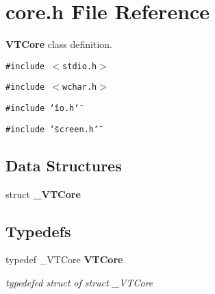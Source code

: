 \section{core.h File Reference}
\label{core_8h}
{\bf VTCore} class definition. 


{\tt \#include $<$stdio.h$>$}\par
{\tt \#include $<$wchar.h$>$}\par
{\tt \#include \char`\"{}io.h\char`\"{}}\par
{\tt \#include \char`\"{}screen.h\char`\"{}}\par
\subsection*{Data Structures}
\begin{CompactItemize}
\item 
struct {\bf \_\-VTCore}
\end{CompactItemize}
\subsection*{Typedefs}
\begin{CompactItemize}
\item 
{}
typedef \_\-VTCore {\bf VTCore}\label{core_8h_a0}

\begin{CompactList}\small\item\em typedefed struct of struct \_\-VTCore\item\end{CompactList}\end{CompactItemize}
